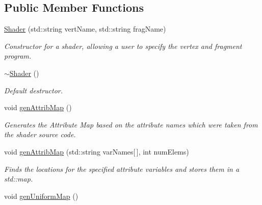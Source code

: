 \subsection*{Public Member Functions}
\begin{DoxyCompactItemize}
\item 
\hyperlink{class_shader_a5786f696ba39232cb732542aed798e82}{Shader} (std\-::string vert\-Name, std\-::string frag\-Name)
\begin{DoxyCompactList}\small\item\em Constructor for a shader, allowing a user to specify the vertex and fragment program. \end{DoxyCompactList}\item 
\hypertarget{class_shader_aff01df87e8a102f270b5b135a295e59d}{\hyperlink{class_shader_aff01df87e8a102f270b5b135a295e59d}{$\sim$\-Shader} ()}\label{class_shader_aff01df87e8a102f270b5b135a295e59d}

\begin{DoxyCompactList}\small\item\em Default destructor. \end{DoxyCompactList}\item 
\hypertarget{class_shader_a40290f101b363f252a15a9c76242ba38}{void \hyperlink{class_shader_a40290f101b363f252a15a9c76242ba38}{gen\-Attrib\-Map} ()}\label{class_shader_a40290f101b363f252a15a9c76242ba38}

\begin{DoxyCompactList}\small\item\em Generates the Attribute Map based on the attribute names which were taken from the shader source code. \end{DoxyCompactList}\item 
void \hyperlink{class_shader_a0f03ffd9d463b2967b8db23006c73679}{gen\-Attrib\-Map} (std\-::string var\-Names\mbox{[}$\,$\mbox{]}, int num\-Elems)
\begin{DoxyCompactList}\small\item\em Finds the locations for the specified attribute variables and stores them in a std\-::map. \end{DoxyCompactList}\item 
\hypertarget{class_shader_ada815acb7d1612225939ed5d63da9b25}{void \hyperlink{class_shader_ada815acb7d1612225939ed5d63da9b25}{gen\-Uniform\-Map} ()}\label{class_shader_ada815acb7d1612225939ed5d63da9b25}


\end{DoxyCompactItemize}
